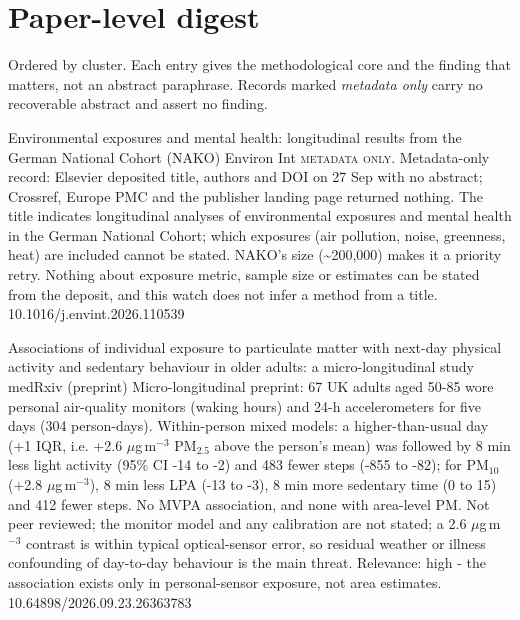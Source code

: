 \documentclass[10pt]{article}
\begin{document}
\vspace{4mm}

\section*{\sffamily\bfseries\color{Deep}Paper-level digest}
\vspace{-1.5mm}{\color{Amber}\rule{\linewidth}{1.1pt}}\vspace{2.5mm}

{\fontsize{7.4}{9}\selectfont\color{Slate}Ordered by cluster. Each entry gives the
methodological core and the finding that matters, not an abstract paraphrase. Records
marked \textit{metadata only} carry no recoverable abstract and assert no finding.\par}

\par{}\baselineskip{}\baselineskip
{}

{Environmental exposures and mental health: longitudinal results from the German National Cohort (NAKO)}
{Environ Int}
{\textsc{metadata only.} Metadata-only record: Elsevier deposited title, authors and DOI on 27 Sep with no abstract; Crossref, Europe PMC and the publisher landing page returned nothing. The title indicates longitudinal analyses of environmental exposures and mental health in the German National Cohort; which exposures (air pollution, noise, greenness, heat) are included cannot be stated. NAKO's size (\textasciitilde{}200,000) makes it a priority retry. Nothing about exposure metric, sample size or estimates can be stated from the deposit, and this watch does not infer a method from a title.}
{10.1016/j.envint.2026.110539}

\par{}\baselineskip{}\baselineskip
{}

{Associations of individual exposure to particulate matter with next-day physical activity and sedentary behaviour in older adults: a micro-longitudinal study}
{medRxiv (preprint)}
{Micro-longitudinal preprint: 67 UK adults aged 50-85 wore personal air-quality monitors (waking hours) and 24-h accelerometers for five days (304 person-days). Within-person mixed models: a higher-than-usual day (+1 IQR, i.e. +2.6 $\mu$g\,m$^{-3}$ PM$_{2.5}$ above the person's mean) was followed by 8 min less light activity (95\% CI -14 to -2) and 483 fewer steps (-855 to -82); for PM$_{10}$ (+2.8 $\mu$g\,m$^{-3}$), 8 min less LPA (-13 to -3), 8 min more sedentary time (0 to 15) and 412 fewer steps. No MVPA association, and none with area-level PM. Not peer reviewed; the monitor model and any calibration are not stated; a 2.6 $\mu$g\,m$^{-3}$ contrast is within typical optical-sensor error, so residual weather or illness confounding of day-to-day behaviour is the main threat. Relevance: high - the association exists only in personal-sensor exposure, not area estimates.}
{10.64898/2026.09.23.26363783}
\end{document}
